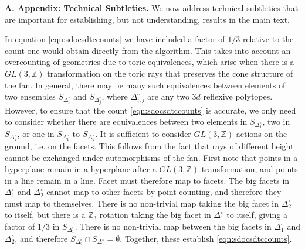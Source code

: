 \documentclass[aps,prl,twocolumn, superscriptaddress,groupedaddress,nofootinbib]{revtex4-1}
\newcommand{\bZ}{\mathbb{Z}}
\newcommand{\sdoc}{S_{\Delta_1^\circ}}
\newcommand{\sdtc}{S_{\Delta_2^\circ}}
\newcommand{\doc}{{\Delta_1^\circ}}
\newcommand{\dtc}{{\Delta_2^\circ}}
\newcommand{\XXX}[3]{{\color{blue}{\bf [#1: } {\tt #3} {\it -#2-}{\bf ]}}}
\begin{document}
\vspace{.2cm}
\noindent \textbf{A. Appendix: Technical Subtleties.} We now
address technical subtleties that are important for establishing,
but not understanding, results in the main text.

In equation \eqref{eqn:sdocsdtccounts} 
we have included a factor of
$1/3$ relative to the count one would obtain directly from the algorithm.
This takes into account an overcounting of geometries due to toric equivalences,
which arise when there is a $GL(3,\bZ)$ transformation on the toric rays
that preserves the cone structure of the fan. In general, there may
be many such equivalences between elements of two ensembles $S_{\Delta_i^\circ}$
and $S_{\Delta_j^\circ}$, where $\Delta_{i,j}^\circ$ are any two $3d$ reflexive
polytopes. However, to ensure that the count  \eqref{eqn:sdocsdtccounts} is accurate,
we only need to consider whether there are equivalences between
two elements in $\sdoc$, two in $\sdtc$, or one in $\sdoc$ to $\sdtc$. It is sufficient to consider $GL(3,\bZ)$ actions
on the ground, i.e. on the facets. This follows from the fact that rays of different height cannot be exchanged under automorphisms of the fan. First note that points in a hyperplane remain in a
hyperplane after a $GL(3,\bZ)$ transformation, and points
in a line remain in a line. Facet must therefore map to
facets. The big facets in $\doc$ and $\dtc$ cannot map
to other facets by point counting, and therefore they
must map to themselves. There is no non-trivial map
taking the big facet in $\dtc$ to itself, but there is
a $\bZ_3$ rotation taking the big facet in $\doc$ to itself, giving a factor of $1/3$ in $\sdoc$. There is no non-trivial
map between the big facets in $\doc$ and $\dtc$, and therefore
$\sdtc\cap \sdoc  = \emptyset.$ Together, these establish
\eqref{eqn:sdocsdtccounts}.

\end{document}
